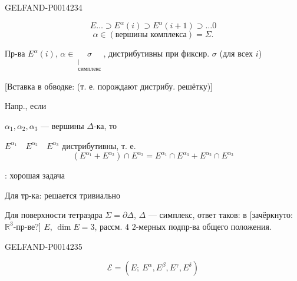 \begin{GelfandAdjacentEvidence}{GELFAND-P001423}{4}

\[
E\ldots\supset E^\alpha(i)\supset E^\alpha(i+1)\supset\ldots 0
\]
\[
\alpha\in(\text{вершины комплекса})=\Sigma.
\]

Пр-ва \(E^\alpha(i)\), \(\alpha\in\underset{\substack{|\\\text{симплекс}}}{\sigma}\),
дистрибутивны при фиксир. \(\sigma\) (для всех \(i\))

[Вставка в обводке: (т. е. порождают дистрибу. решётку)]

Напр., если

\(\alpha_1,\alpha_2,\alpha_3\) — вершины \(\Delta\)-ка, то

\(E^{\alpha_1}\quad E^{\alpha_2}\quad E^{\alpha_3}\) дистрибутивны, т. е.
\[
(E^{\alpha_1}+E^{\alpha_2})\cap E^{\alpha_3}
=E^{\alpha_1}\cap E^{\alpha_3}+E^{\alpha_2}\cap E^{\alpha_3}
\]

: хорошая задача

Для тр-ка: решается тривиально

Для поверхности тетраэдра \(\Sigma=\partial\Delta\), \(\Delta\) — симплекс, ответ таков: в
[зачёркнуто: \(\mathbb R^3\)-пр-ве?] \(E\), \(\dim E=3\), рассм. \(4\) \(2\)-мерных подпр-ва общего положения.
\end{GelfandAdjacentEvidence}
\begin{GelfandAdjacentEvidence}{GELFAND-P001423}{5}

\[
\mathcal E=(E;\ E^\alpha,E^\beta,E^\gamma,E^\delta)
\]
\end{GelfandAdjacentEvidence}



